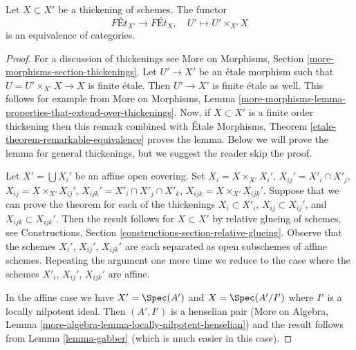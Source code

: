 \begin{lemma}
\label{lemma-thickening}
Let $X \subset X'$ be a thickening of schemes. The functor
$$
\textit{F\'Et}_{X'} \longrightarrow \textit{F\'Et}_X,\quad
U' \longmapsto U' \times_{X'} X
$$
is an equivalence of categories.
\end{lemma}

\begin{proof}
For a discussion of thickenings see
More on Morphisms, Section \ref{more-morphisms-section-thickenings}.
Let $U' \to X'$ be an \'etale morphism such that $U = U' \times_{X'} X \to X$
is finite \'etale. Then $U' \to X'$ is finite \'etale as well.
This follows for example from More on Morphisms, Lemma
\ref{more-morphisms-lemma-properties-that-extend-over-thickenings}.
Now, if $X \subset X'$ is a finite order thickening then this remark
combined with \'Etale Morphisms, Theorem
\ref{etale-theorem-remarkable-equivalence}
proves the lemma. Below we will prove the lemma for general thickenings, but
we suggest the reader skip the proof.

\medskip\noindent
Let $X' = \bigcup X_i'$ be an affine open covering. Set
$X_i = X \times_{X'} X_i'$, $X_{ij}' = X'_i \cap X'_j$,
$X_{ij} = X \times_{X'} X_{ij}'$, $X_{ijk}' = X'_i \cap X'_j \cap X'_k$,
$X_{ijk} = X \times_{X'} X_{ijk}'$.
Suppose that we can prove
the theorem for each of the thickenings
$X_i \subset X'_i$, $X_{ij} \subset X_{ij}'$, and $X_{ijk} \subset X_{ijk}'$.
Then the result follows for $X \subset X'$ by relative glueing of
schemes, see
Constructions, Section \ref{constructions-section-relative-glueing}.
Observe that the schemes $X_i'$, $X_{ij}'$, $X_{ijk}'$ are
each separated as open subschemes of affine schemes. Repeating the
argument one more time we reduce to the case where the schemes
$X'_i$, $X_{ij}'$, $X_{ijk}'$ are affine.

\medskip\noindent
In the affine case we have $X' = \Spec(A')$ and $X = \Spec(A'/I')$
where $I'$ is a locally nilpotent ideal. Then $(A', I')$ is a
henselian pair (More on Algebra, Lemma
\ref{more-algebra-lemma-locally-nilpotent-henselian})
and the result follows from Lemma \ref{lemma-gabber} (which is
much easier in this case).
\end{proof}
